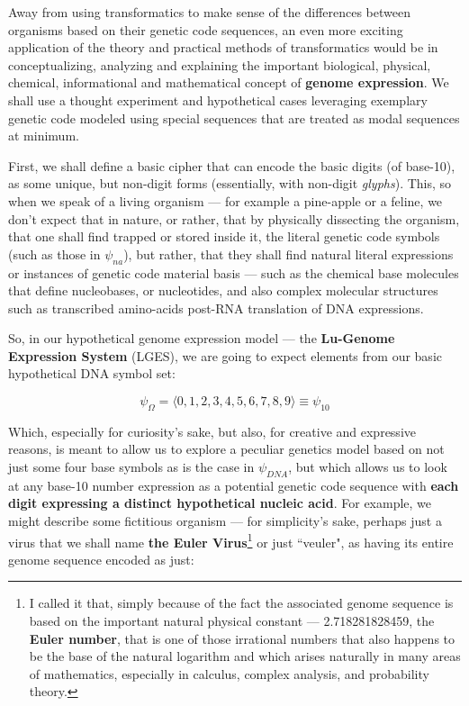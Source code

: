 \documentclass[a4paper, 18pt]{book} %
\begin{document}
Away from using transformatics to make sense of the differences between organisms based on their genetic code sequences, an even more exciting application of the theory and practical methods of transformatics would be in conceptualizing, analyzing and explaining the important biological, physical, chemical, informational and mathematical concept of \textbf{genome expression}. We shall use a thought experiment and hypothetical cases leveraging exemplary genetic code modeled using special sequences that are treated as modal sequences at minimum.

First, we shall define a basic cipher that can encode the basic digits (of base-10), as some unique, but non-digit forms (essentially, with non-digit \textit{glyphs}). This, so when we speak of a living organism --- for example a pine-apple or a feline, we don't expect that in nature, or rather, that by physically dissecting the organism, that one shall find trapped or stored inside it, the literal genetic code symbols (such as those in $\psi_{na}$), but rather, that they shall find natural literal expressions or instances of genetic code material basis --- such as the chemical base molecules that define nucleobases, or nucleotides, and also complex molecular structures such as transcribed amino-acids post-RNA translation of DNA expressions.

So, in our hypothetical genome expression model --- the \textbf{Lu-Genome Expression System} (LGES), we are going to expect elements from our basic hypothetical DNA symbol set:

\begin{equation}
\label{EQHYPDNASS}
\psi_{\Omega} = \langle 0, 1, 2, 3, 4, 5, 6, 7, 8, 9 \rangle \equiv \psi_{10}
\end{equation}

Which, especially for curiosity's sake, but also, for creative and expressive reasons, is meant to allow us to explore a peculiar genetics model based on not just some four base symbols as is the case in $\psi_{DNA}$, but which allows us to look at any base-10 number expression as a potential genetic code sequence with \textbf{each digit expressing a distinct hypothetical nucleic acid}. For example, we might describe some fictitious organism --- for simplicity's sake, perhaps just a virus that we shall name \textbf{the Euler Virus}\footnote{I called it that, simply because of the fact the associated genome sequence is based on the important natural physical constant --- 2.718281828459, the \textbf{Euler number}, that is one of those irrational numbers that also happens to be the base of the natural logarithm and which arises naturally in many areas of mathematics, especially in calculus, complex analysis, and probability theory.} or just ``veuler", as having its entire genome sequence encoded as just:
\end{document}
